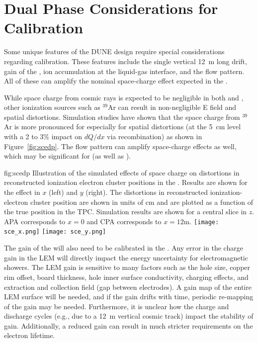 \section{Dual Phase Considerations for Calibration}
\label{sec:DP}

Some unique features of the DUNE  design require special considerations regarding calibration. These features include the single vertical \SI{12}{\m} long drift, gain of the , ion accumulation at the liquid-gas interface, and the \lar flow pattern. All of these can amplify the nominal space-charge effect expected in the \detmodule. 

While space charge from cosmic rays is expected to be negligible in both %
\spmod and \dpmod, other ionization sources such as ${^{39}}$Ar can result in non-negligible E field and spatial distortions. Simulation studies have shown that the space charge from ${^{39}}$Ar is more pronounced for  especially for spatial distortions (at the \SI{5}{\cm} level with a \num{2} to \num{3}\% impact on %
$dQ/dx$ via recombination) as shown in Figure~\ref{fig:scedp}. The
\lar flow pattern can amplify space-charge effects as well, which may be significant for \dual (as well as \single).

\begin{dunefigure}
{fig:scedp}
{Illustration of the simulated effects of space charge on distortions in reconstructed ionization electron cluster positions in the %
\dpmod. Results are shown for the effect in $x$ (left) and $y$ (right). The distortions in reconstructed ionization-electron cluster position are shown in units of \si{\centi\m} and are plotted as a function of the true position in the TPC. Simulation results are shown for a central slice in $z$. APA corresponds to $x=0$ and CPA corresponds to $x=12$\si{\m}.}
\texttt{[image: sce\_x.png]}
\texttt{[image: sce\_y.png]}
\end{dunefigure}

The gain of the  will also need to be calibrated in the \dpmod. Any error in the charge gain in the LEM will directly impact the energy uncertainty for electromagnetic showers. The LEM gain is sensitive to many factors such as the hole size, copper rim offset, board thickness, hole inner surface conductivity, charging effects, and extraction and collection field (gap between electrodes). 
A gain map of the entire LEM surface will be needed, and if the gain drifts with time, periodic re-mapping of the gain may be needed. Furthermore, it is unclear how the charge and discharge cycles (e.g., due to a \SI{12}{\m} vertical cosmic track) impact the stability of gain. Additionally, a reduced gain can result in much stricter requirements on the electron lifetime. 

